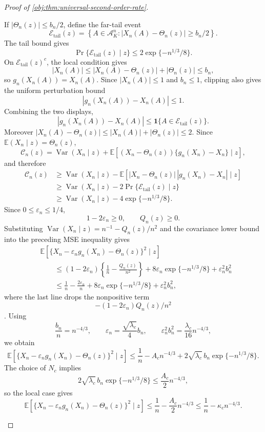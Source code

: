\begin{proof}[Proof of \cref{obj:thm:universal-second-order-rate}]
\begin{enumerate}
If \(|\Theta_n(z)|\le b_n/2\), define the far-tail event
\[
\mathscr E_{\mathrm{tail}}(z)
=
\left\{A\in\mathcal A_K^n:
|X_n(A)-\Theta_n(z)|\ge b_n/2\right\}.
\]
The tail bound gives
\[
\Pr\{\mathscr E_{\mathrm{tail}}(z)\mid z\}
\le 2\exp\{-n^{1/3}/8\}.
\]
On \(\mathscr E_{\mathrm{tail}}(z)^c\), the local condition gives
\[
|X_n(A)|
\le |X_n(A)-\Theta_n(z)|+|\Theta_n(z)|
\le b_n,
\]
so \(g_n(X_n(A))=X_n(A)\). Since \(|X_n(A)|\le1\) and \(b_n\le1\), clipping also gives the uniform perturbation bound
\[
|g_n(X_n(A))-X_n(A)|\le 1.
\]
Combining the two displays,
\[
|g_n(X_n(A))-X_n(A)|
\le \mathbf 1\{A\in\mathscr E_{\mathrm{tail}}(z)\}.
\]
Moreover \(|X_n(A)-\Theta_n(z)|\le |X_n(A)|+|\Theta_n(z)|\le2\). Since \(\mathbb E(X_n\mid z)=\Theta_n(z)\),
\[
\mathcal C_n(z)
=
\operatorname{Var}(X_n\mid z)
+\mathbb E\!\left[(X_n-\Theta_n(z))\{g_n(X_n)-X_n\}\mid z\right],
\]
and therefore
\[
\begin{aligned}
\mathcal C_n(z)
&\ge \operatorname{Var}(X_n\mid z)
-\mathbb E\!\left[|X_n-\Theta_n(z)|\,|g_n(X_n)-X_n|\mid z\right]\\
&\ge \operatorname{Var}(X_n\mid z)-2\Pr\{\mathscr E_{\mathrm{tail}}(z)\mid z\}\\
&\ge \operatorname{Var}(X_n\mid z)-4\exp\{-n^{1/3}/8\}.
\end{aligned}
\]
Since \(0\le\varepsilon_n\le1/4\),
\[
1-2\varepsilon_n\ge0,
\qquad
Q_n(z)\ge0.
\]
Substituting \(\operatorname{Var}(X_n\mid z)=n^{-1}-Q_n(z)/n^2\) and the covariance lower bound into the preceding MSE inequality gives
\[
\begin{aligned}
&\mathbb E\!\left[\{X_n-\varepsilon_n g_n(X_n)-\Theta_n(z)\}^2\mid z\right] \\
&\qquad\le
\left(1-2\varepsilon_n\right)
\left\{\frac1n-\frac{Q_n(z)}{n^2}\right\}
+8\varepsilon_n\exp\{-n^{1/3}/8\}
+\varepsilon_n^2b_n^2 \\
&\qquad\le
\frac1n-\frac{2\varepsilon_n}{n}
+8\varepsilon_n\exp\{-n^{1/3}/8\}
+\varepsilon_n^2b_n^2,
\end{aligned}
\]
where the last line drops the nonpositive term
\[-(1-2\varepsilon_n)Q_n(z)/n^2\]. Using
\[
\frac{b_n}{n}=n^{-4/3},
\qquad
\varepsilon_n=\frac{\sqrt{\lambda_c}}4 b_n,
\qquad
\varepsilon_n^2b_n^2
=
\frac{\lambda_c}{16}n^{-4/3},
\]
we obtain
\[
\mathbb E\!\left[\{X_n-\varepsilon_n g_n(X_n)-\Theta_n(z)\}^2\mid z\right]
\le
\frac1n-A_c n^{-4/3}
+2\sqrt{\lambda_c}\,b_n\exp\{-n^{1/3}/8\}.
\]
The choice of \(N_c\) implies
\[
2\sqrt{\lambda_c}\,b_n\exp\{-n^{1/3}/8\}
\le
\frac{A_c}{2}n^{-4/3},
\]
so the local case gives
\[
\mathbb E\!\left[\{X_n-\varepsilon_n g_n(X_n)-\Theta_n(z)\}^2\mid z\right]
\le
\frac1n-\frac{A_c}{2}n^{-4/3}
\le
\frac1n-\kappa_c n^{-4/3}.
\]


\end{enumerate}
\end{proof}
